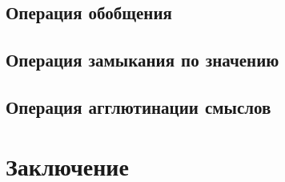 \documentclass[12pt]{scrartcl}
\begin{document}
	\subsection{Операция обобщения}
	
	\subsection{Операция замыкания по значению}
	
	\subsection{Операция агглютинации смыслов}
	
	\section*{Заключение}
	
	\printbibliography
\end{document}
